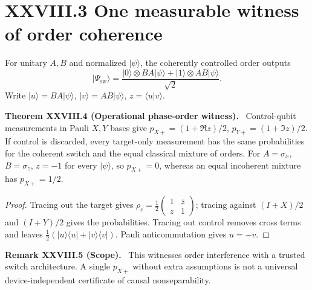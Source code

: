 \documentclass[11pt,a4paper,oneside]{book}
\newcommand{\statement}[3]{\par\medskip\noindent\textbf{#1 #2 (#3).}\ }
\begin{document}
\section*{XXVIII.3 One measurable witness of order coherence}
For unitary $A,B$ and normalized $|\psi\rangle$, the coherently controlled order outputs
\[|\Psi_{\mathrm{sw}}\rangle=\frac{|0\rangle\otimes BA|\psi\rangle+|1\rangle\otimes AB|\psi\rangle}{\sqrt2}.\]
Write $|u\rangle=BA|\psi\rangle$, $|v\rangle=AB|\psi\rangle$, $z=\langle u|v\rangle$.
\statement{Theorem}{XXVIII.4}{Operational phase-order witness} Control-qubit measurements in Pauli $X,Y$ bases give $p_{X+}=(1+\Re z)/2$, $p_{Y+}=(1+\Im z)/2$. If control is discarded, every target-only measurement has the same probabilities for the coherent switch and the equal classical mixture of orders. For $A=\sigma_x$, $B=\sigma_z$, $z=-1$ for every $|\psi\rangle$, so $p_{X+}=0$, whereas an equal incoherent mixture has $p_{X+}=1/2$.
\begin{proof}Tracing out the target gives $\rho_c=\frac12\left(\begin{smallmatrix}1&\overline z\\z&1\end{smallmatrix}\right)$; tracing against $(I+X)/2$ and $(I+Y)/2$ gives the probabilities. Tracing out control removes cross terms and leaves $\frac12(|u\rangle\langle u|+|v\rangle\langle v|)$. Pauli anticommutation gives $u=-v$.\end{proof}
\statement{Remark}{XXVIII.5}{Scope} This witnesses order interference with a trusted switch architecture. A single $p_{X+}$ without extra assumptions is not a universal device-independent certificate of causal nonseparability.
\end{document}
